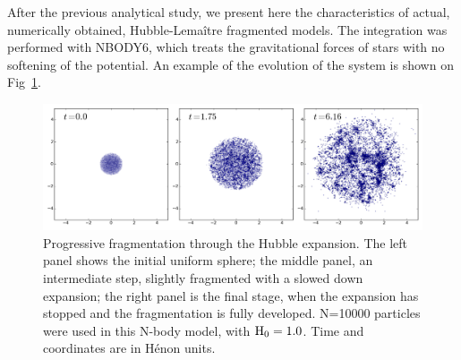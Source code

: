 After the previous analytical study, we present here the characteristics of actual, numerically obtained, Hubble-Lema\^itre fragmented models. The integration was performed with NBODY6, which treats the gravitational forces of stars with no softening of the potential. An example of the evolution of the system is shown on Fig~\ref{Fig:1_fragmentation}. 



\begin{figure}
\begin{center}
\includegraphics[width=\textwidth]{Figures/1_fragmentation}
\caption{Progressive fragmentation through the Hubble expansion. The left panel shows the initial uniform sphere; the middle panel, an intermediate step, slightly fragmented with a slowed down expansion; the right panel is the final stage, when the expansion has stopped and the fragmentation is fully developed. N=10000 particles were used in this N-body model, with ${\textrm{H}}_0 = 1.0$. Time and coordinates are in H\'enon units.}
\label{Fig:1_fragmentation}
\end{center}
\end{figure}

